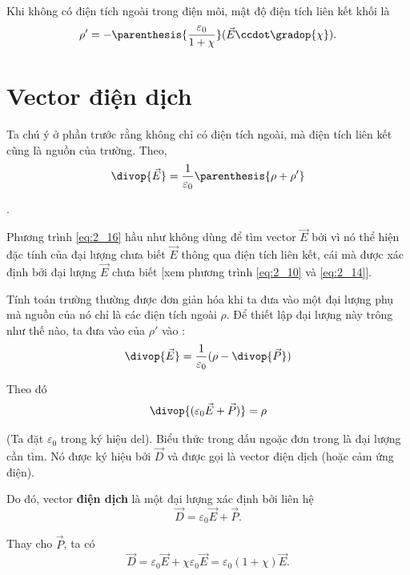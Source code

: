 Khi không có điện tích ngoài trong điện môi, mật độ điện tích liên kết khối là
\begin{equation}\label{eq:2_15}
    \rho' = - \parenthesis{\frac{\varepsilon_0}{1+\chi}} (\vec{E}\ccdot\gradop{\chi}).
\end{equation}

\section{Vector điện dịch}\label{sec:2_5}

Ta chú ý ở phần trước rằng không chỉ có điện tích ngoài, mà điện tích liên kết cũng là nguồn của trường. Theo,
\begin{equation}\label{eq:2_16}
    \divop{\vec{E}} = \frac{1}{\varepsilon_0} \parenthesis{\rho + \rho'}
\end{equation}

.

Phương trình \eqref{eq:2_16} hầu như không dùng để tìm vector $\vec{E}$ bởi vì nó thể hiện đặc tính của đại lượng chưa biết $\vec{E}$ thông qua điện tích liên kết, cái mà được xác định bởi đại lượng $\vec{E}$ chưa biết [xem phương trình \eqref{eq:2_10} và \eqref{eq:2_14}].

Tính toán trường thường được đơn giản hóa khi ta đưa vào một đại lượng phụ mà nguồn của nó chỉ là các điện tích ngoài $\rho$. Để thiết lập đại lượng này trông như thế nào, ta đưa vào  của $\rho'$ vào :
\begin{equation*}
    \divop{\vec{E}} = \frac{1}{\varepsilon_0} (\rho - \divop{\vec{P}})
\end{equation*}

\noindent
Theo đó
\begin{equation}\label{eq:2_17}
    \divop{(\varepsilon_0\vec{E} + \vec{P})} = \rho
\end{equation}

\noindent
(Ta đặt $\varepsilon_0$ trong ký hiệu del). Biểu thức trong dấu ngoặc đơn trong  là đại lượng cần tìm. Nó được ký hiệu bởi $\vec{D}$ và được gọi là vector điện dịch (hoặc cảm ứng điện).

Do đó, vector \textbf{điện dịch} là một đại lượng xác định bởi liên hệ
\begin{equation}\label{eq:2_18}
    \vec{D} = \varepsilon_0\vec{E} + \vec{P}.
\end{equation}

\noindent
Thay  cho $\vec{P}$, ta có
\begin{equation}\label{eq:2_19}
    \vec{D} = \varepsilon_0\vec{E} + \chi\varepsilon_0\vec{E} = \varepsilon_0 (1+\chi) \vec{E}.
\end{equation}

